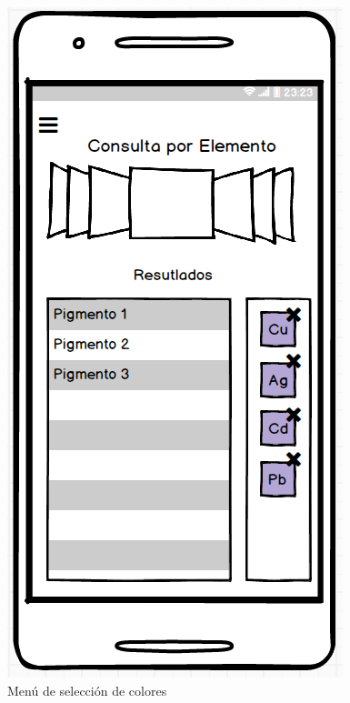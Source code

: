 \begin{multicols}{3}
    \begin{figure}[H]
    \centering
    \includegraphics[scale=0.5]{imagenes/diseno/elementos1.png}
    \caption{Menú de selección de colores}
    \label{fig:consultaColores}
    \end{figure}
    

\end{multicols}
